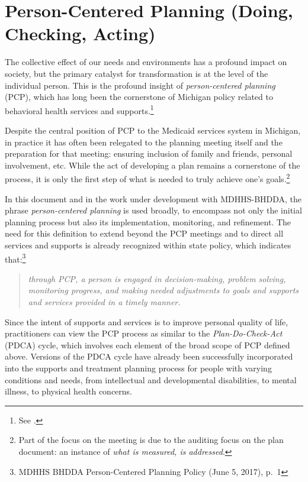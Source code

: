 \documentclass[
]{book}
\begin{document}
\hypertarget{pcpdca}{%
\chapter{Person-Centered Planning (Doing, Checking, Acting)}\label{pcpdca}}

The collective effect of our needs and environments has a profound impact on society, but the primary catalyst for transformation is at the level of the individual person. This is the profound insight of \emph{person-centered planning} (PCP), which has long been the cornerstone of Michigan policy related to behavioral health services and supports.\footnote{See \citet{mi-mhc}.}

Despite the central position of PCP to the Medicaid services system in Michigan, in practice it has often been relegated to the planning meeting itself and the preparation for that meeting: ensuring inclusion of family and friends, personal involvement, etc. While the act of developing a plan remains a cornerstone of the process, it is only the first step of what is needed to truly achieve one's goals.\footnote{Part of the focus on the meeting is due to the auditing focus on the plan document: an instance of \emph{what is measured, is addressed}.}

In this document and in the work under development with MDHHS-BHDDA, the phrase \emph{person-centered planning} is used broadly, to encompass not only the initial planning process but also its implementation, monitoring, and refinement. The need for this definition to extend beyond the PCP meetings and to direct all services and supports is already recognized within state policy, which indicates that:\footnote{MDHHS BHDDA Person-Centered Planning Policy (June 5, 2017), p.~1}

\begin{quote}
\emph{through PCP, a person is engaged in decision-making, problem solving, monitoring progress, and making needed adjustments to goals and supports and services provided in a timely manner.}
\end{quote}

Since the intent of supports and services is to improve personal quality of life, practitioners can view the PCP process as similar to the \emph{Plan-Do-Check-Act} (PDCA) cycle, which involves each element of the broad scope of PCP defined above. Versions of the PDCA cycle have already been successfully incorporated into the supports and treatment planning process for people with varying conditions and needs, from intellectual and developmental disabilities, to mental illness, to physical health concerns.
\end{document}
